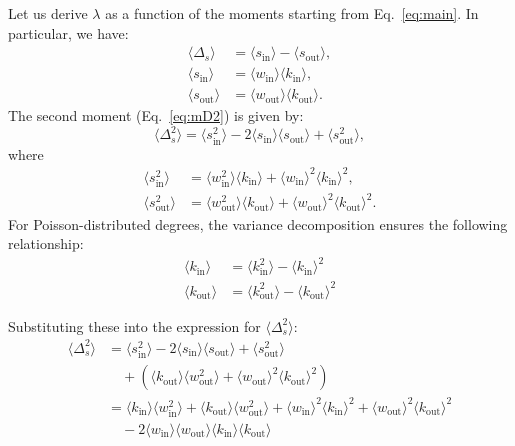 \documentclass[a4paper,pre,superscriptaddress,floatfix,nofootinbib,twocolumn]{revtex4-1}
\begin{document}
Let us derive $\lambda$ as a function of the moments starting from Eq.~\eqref{eq:main}.
In particular, we have:
\begin{align*}
\langle \Delta_{s} \rangle &= \langle s_\text{in} \rangle - \langle s_\text{out} \rangle, \\
\langle s_\text{in} \rangle &= \langle w_\text{in} \rangle \langle k_{\text{in}} \rangle, \\
\langle s_\text{out} \rangle &= \langle w_\text{out} \rangle \langle k_{\text{out}} \rangle.
\end{align*}
The second moment (Eq.~\eqref{eq:mD2}) is given by:
\begin{equation*}
\langle \Delta_{s}^2 \rangle = \langle s^2_\text{in} \rangle - 2 \langle s_\text{in} \rangle \langle s_\text{out} \rangle + \langle s^2_\text{out} \rangle,
\end{equation*}
where
\begin{align*}
\langle s^2_\text{in} \rangle &= \langle w^2_\text{in} \rangle \langle k_{\text{in}} \rangle + \langle w_\text{in} \rangle^2 \langle k_{\text{in}} \rangle^2, \\
\langle s^2_\text{out} \rangle &= \langle w^2_\text{out} \rangle \langle k_{\text{out}} \rangle + \langle w_\text{out} \rangle^2 \langle k_{\text{out}} \rangle^2.
\end{align*}
For Poisson-distributed degrees, the variance decomposition ensures the following relationship:
\begin{align*}
\langle k_{\text{in}} \rangle &= \langle k_{\text{in}}^2 \rangle - \langle k_{\text{in}} \rangle^2 \\
\langle k_{\text{out}} \rangle &= \langle k_{\text{out}}^2 \rangle - \langle k_{\text{out}} \rangle^2
\end{align*}


Substituting these into the expression for $\langle \Delta_{s}^2 \rangle$:
\begin{align*}
\langle \Delta_{s}^2 \rangle &= \langle s^2_\text{in} \rangle - 2 \langle s_\text{in} \rangle \langle s_\text{out} \rangle + \langle s^2_\text{out} \rangle\\
&\quad + (\langle k_{\text{out}} \rangle \langle w^2_\text{out} \rangle + \langle w_\text{out} \rangle^2 \langle k_{\text{out}} \rangle^2)\\
&= \langle k_{\text{in}} \rangle \langle w^2_\text{in} \rangle + \langle k_{\text{out}} \rangle \langle w^2_\text{out} \rangle + \langle w_\text{in} \rangle^2 \langle k_{\text{in}} \rangle^2 + \langle w_\text{out} \rangle^2 \langle k_{\text{out}} \rangle^2 \\
&\quad - 2 \langle w_\text{in} \rangle \langle w_\text{out} \rangle \langle k_{\text{in}} \rangle \langle k_{\text{out}} \rangle
\end{align*}
\end{document}
